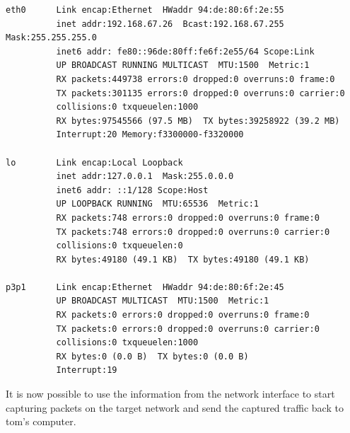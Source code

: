 \documentclass{article}
\begin{document}
\begin{verbatim}
eth0      Link encap:Ethernet  HWaddr 94:de:80:6f:2e:55  
          inet addr:192.168.67.26  Bcast:192.168.67.255  Mask:255.255.255.0
          inet6 addr: fe80::96de:80ff:fe6f:2e55/64 Scope:Link
          UP BROADCAST RUNNING MULTICAST  MTU:1500  Metric:1
          RX packets:449738 errors:0 dropped:0 overruns:0 frame:0
          TX packets:301135 errors:0 dropped:0 overruns:0 carrier:0
          collisions:0 txqueuelen:1000 
          RX bytes:97545566 (97.5 MB)  TX bytes:39258922 (39.2 MB)
          Interrupt:20 Memory:f3300000-f3320000 

lo        Link encap:Local Loopback  
          inet addr:127.0.0.1  Mask:255.0.0.0
          inet6 addr: ::1/128 Scope:Host
          UP LOOPBACK RUNNING  MTU:65536  Metric:1
          RX packets:748 errors:0 dropped:0 overruns:0 frame:0
          TX packets:748 errors:0 dropped:0 overruns:0 carrier:0
          collisions:0 txqueuelen:0 
          RX bytes:49180 (49.1 KB)  TX bytes:49180 (49.1 KB)

p3p1      Link encap:Ethernet  HWaddr 94:de:80:6f:2e:45  
          UP BROADCAST MULTICAST  MTU:1500  Metric:1
          RX packets:0 errors:0 dropped:0 overruns:0 frame:0
          TX packets:0 errors:0 dropped:0 overruns:0 carrier:0
          collisions:0 txqueuelen:1000 
          RX bytes:0 (0.0 B)  TX bytes:0 (0.0 B)
          Interrupt:19 
\end{verbatim}

It is now possible to use the information from the network interface to start capturing packets on the target network and send the captured traffic back to tom's computer. 
\end{document}
